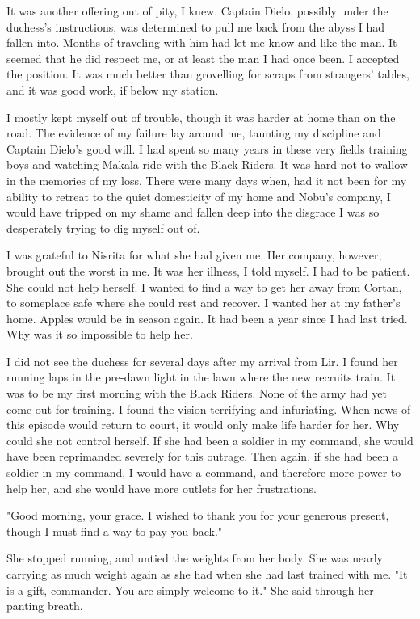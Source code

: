 \documentclass{article}
\begin{document}
It was another offering out of pity, I knew. Captain Dielo, possibly under the duchess's instructions, was determined to pull me back from the abyss I had fallen into. Months of traveling with him had let me know and like the man. It seemed that he did respect me, or at least the man I had once been. I accepted the position. It was much better than grovelling for scraps from strangers' tables, and it was good work, if below my station. 

I mostly kept myself out of trouble, though it was harder at home than on the road. The evidence of my failure lay around me, taunting my discipline and Captain Dielo's good will. I had spent so many years in these very fields training boys and watching Makala ride with the Black Riders. It was hard not to wallow in the memories of my loss. There were many days when, had it not been for my ability to retreat to the quiet domesticity of my home and Nobu's company, I would have tripped on my shame and fallen deep into the disgrace I was so desperately trying to dig myself out of. 

I was grateful to Nisrita for what she had given me. Her company, however, brought out the worst in me. It was her illness, I told myself. I had to be patient. She could not help herself. I wanted to find a way to get her away from Cortan, to someplace safe where she could rest and recover. I wanted her at my father's home. Apples would be in season again. It had been a year since I had last tried. Why was it so impossible to help her. 

I did not see the duchess for several days after my arrival from Lir. I found her running laps in the pre-dawn light in the lawn where the new recruits train. It was to be my first morning with the Black Riders. None of the army had yet come out for training. I found the vision terrifying and infuriating. When news of this episode would return to court, it would only make life harder for her. Why could she not control herself. If she had been a soldier in my command, she would have been reprimanded severely for this outrage. Then again, if she had been a soldier in my command, I would have a command, and therefore more power to help her, and she would have more outlets for her frustrations.

"Good morning, your grace. I wished to thank you for your generous present, though I must find a way to pay you back."

She stopped running, and untied the weights from her body. She was nearly carrying as much weight again as she had when she had last trained with me. "It is a gift, commander. You are simply welcome to it." She said through her panting breath. 
\end{document}

